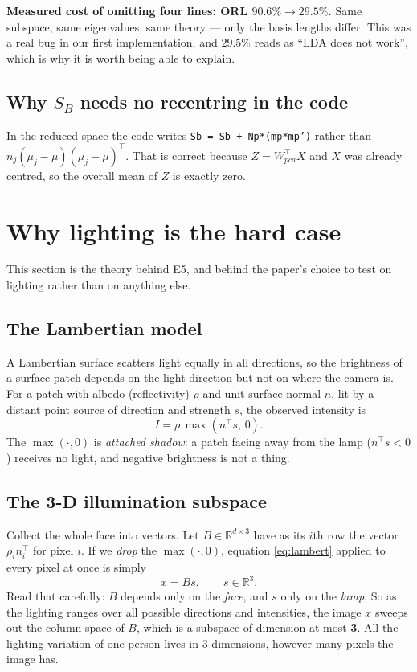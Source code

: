 \documentclass[11pt]{article}
\newcommand{\T}{^{\top}}
\begin{document}
\textbf{Measured cost of omitting four lines: ORL $90.6\%\to29.5\%$.} Same
subspace, same eigenvalues, same theory --- only the basis lengths differ. This
was a real bug in our first implementation, and $29.5\%$ reads as ``LDA does not
work'', which is why it is worth being able to explain.

\subsection{Why $S_B$ needs no recentring in the code}
In the reduced space the code writes \texttt{Sb = Sb + Np*(mp*mp')} rather than
$n_j(\mu_j-\mu)(\mu_j-\mu)\T$. That is correct because $Z=W_{pca}\T X$ and $X$
was already centred, so the overall mean of $Z$ is exactly zero.

\section{Why lighting is the hard case}
This section is the theory behind E5, and behind the paper's choice to test on
lighting rather than on anything else.

\subsection{The Lambertian model}
A Lambertian surface scatters light equally in all directions, so the
brightness of a surface patch depends on the light direction but not on where
the camera is. For a patch with albedo (reflectivity) $\rho$ and unit surface
normal $n$, lit by a distant point source of direction and strength $s$, the
observed intensity is
\begin{equation}
I=\rho\,\max(n\T s,\,0).
\label{eq:lambert}
\end{equation}
The $\max(\cdot,0)$ is \emph{attached shadow}: a patch facing away from the
lamp ($n\T s<0$) receives no light, and negative brightness is not a thing.

\subsection{The 3-D illumination subspace}
Collect the whole face into vectors. Let $B\in\mathbb R^{d\times3}$ have as its
$i$th row the vector $\rho_in_i\T$ for pixel $i$. If we \emph{drop} the
$\max(\cdot,0)$, equation \eqref{eq:lambert} applied to every pixel at once is
simply
\begin{equation}
x=Bs,\qquad s\in\mathbb R^3 .
\label{eq:cone}
\end{equation}
Read that carefully: $B$ depends only on the \emph{face}, and $s$ only on the
\emph{lamp}. So as the lighting ranges over all possible directions and
intensities, the image $x$ sweeps out the column space of $B$, which is a
subspace of dimension at most \textbf{3}. All the lighting variation of one
person lives in 3 dimensions, however many pixels the image has.
\end{document}
